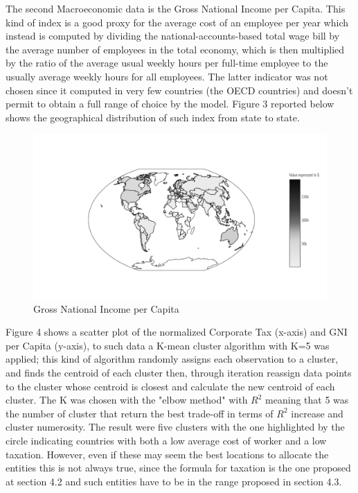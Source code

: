 \begin{doublespace}
The second Macroeconomic data is the Gross National Income per Capita. This kind of index is a good proxy for the average cost of an employee per year which instead is computed by dividing the national-accounts-based total wage bill by the average number of employees in the total economy, which is then multiplied by the ratio of the average usual weekly hours per full-time employee to the usually average weekly hours for all employees. The latter indicator was not chosen since it computed in very few countries (the OECD countries) and doesn't permit to obtain a full range of choice by the model. Figure 3 reported below shows the geographical distribution of such index from state to state.
\begin{figure}
  \centering
  \includegraphics[width=1\linewidth]{Images/GNIworld.png}
  \caption{Gross National Income per Capita}
  \label{fig:test2}
\end{figure}

Figure 4 shows a scatter plot of the normalized Corporate Tax (x-axis) and GNI per Capita (y-axis), to such data a  K-mean cluster algorithm with K=5 was applied; this kind of algorithm randomly assigns each observation to a cluster, and finds the centroid of each cluster then, through iteration reassign data points to the cluster whose centroid is closest and calculate the new centroid of each cluster. The K was chosen with the "elbow method" with $R^2$ meaning that 5 was the number of cluster that return the best trade-off in terms of $R^2$ increase and cluster numerosity.
The result were five clusters with the one highlighted by the circle indicating countries with both a low average cost of worker and a low taxation. However, even if these may seem the best locations to allocate the entities this is not always true, since the formula for taxation is the one proposed at section 4.2 and such entities have to be in the range proposed in section 4.3.


\end{doublespace}
